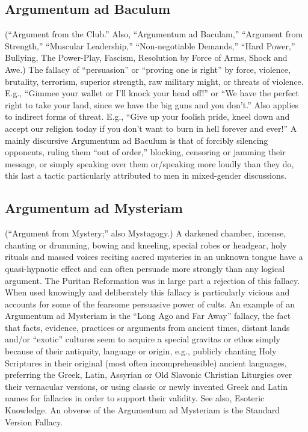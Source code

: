 \documentclass[10pt,a4paper,british]{article}
\begin{document}
\begin{multicols}{2}
	\subsection{Argumentum ad Baculum} (``Argument from the Club.'' Also,
	``Argumentum ad Baculam,'' ``Argument from Strength,'' ``Muscular
	Leadership,'' ``Non{-}negotiable Demands,'' ``Hard Power,'' Bullying, The
	Power{-}Play, Fascism, Resolution by Force of Arms, Shock and Awe.) The
	fallacy of ``persuasion'' or ``proving one is right'' by force, violence,
	brutality, terrorism, superior strength, raw military might, or threats of
	violence. E.g., ``Gimmee your wallet or I'll knock your head off!'' or ``We
	have the perfect right to take your land, since we have the big guns and
	you don't.'' Also applies to indirect forms of threat. E.g., ``Give up your
	foolish pride, kneel down and accept our religion today if you don't want
	to burn in hell forever and ever!'' A mainly discursive Argumentum ad
	Baculum is that of forcibly silencing opponents, ruling them ``out of
	order,'' blocking, censoring or jamming their message, or simply speaking
	over them or/speaking more loudly than they do, this last a tactic
	particularly attributed to men in mixed{-}gender discussions.

	\subsection{Argumentum ad Mysteriam} (``Argument from Mystery;'' also
	Mystagogy.) A darkened chamber, incense, chanting or drumming, bowing and
	kneeling, special robes or headgear, holy rituals and massed voices
	reciting sacred mysteries in an unknown tongue  have a quasi{-}hypnotic
	effect and can often persuade more strongly than any logical argument.  The
	Puritan Reformation was in large part a rejection of this fallacy. When
	used knowingly and deliberately this fallacy is particularly vicious and
	accounts for some of the fearsome persuasive power of cults.  An example of
	an Argumentum ad Mysteriam is the ``Long Ago and Far Away'' fallacy, the
	fact that facts, evidence, practices or arguments from ancient times,
	distant lands and/or ``exotic'' cultures  seem to acquire a special
	gravitas or ethos simply because of their antiquity, language or origin,
	e.g., publicly chanting Holy Scriptures in their original (most often
	incomprehensible) ancient languages, preferring the Greek, Latin, Assyrian
	or Old Slavonic Christian Liturgies over their vernacular versions, or
	using classic or newly invented Greek and Latin names for fallacies in
	order to support their validity. See also, Esoteric Knowledge. An obverse
	of the Argumentum ad Mysteriam is the Standard Version Fallacy.


\end{multicols}
\end{document}
